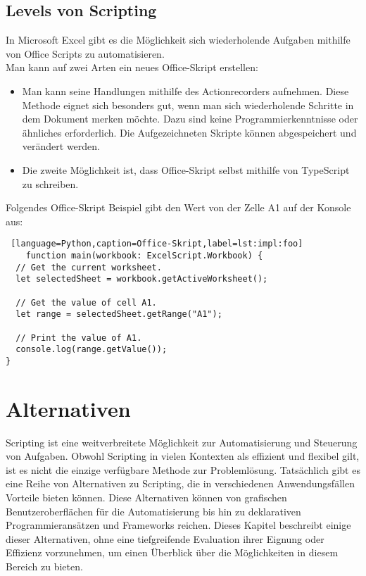 \newpage

\subsection*{Levels von Scripting}

In Microsoft Excel gibt es die Möglichkeit sich wiederholende Aufgaben mithilfe 
von Office Scripts zu automatisieren.
\\
Man kann auf zwei Arten ein neues Office-Skript erstellen:
\begin{itemize}
    \item Man kann seine Handlungen mithilfe des Actionrecorders aufnehmen. 
    Diese Methode eignet sich besonders gut, wenn man sich wiederholende 
    Schritte in dem Dokument merken möchte. Dazu sind keine Programmierkenntnisse 
    oder ähnliches erforderlich. Die Aufgezeichneten Skripte können 
    abgespeichert und verändert werden.
    \item Die zweite Möglichkeit ist, dass Office-Skript selbst mithilfe 
    von TypeScript zu schreiben.
\end{itemize}

Folgendes Office-Skript Beispiel gibt den Wert von der Zelle A1 auf der Konsole aus:

\begin{lstlisting} [language=Python,caption=Office-Skript,label=lst:impl:foo]
    function main(workbook: ExcelScript.Workbook) {
  // Get the current worksheet.
  let selectedSheet = workbook.getActiveWorksheet();

  // Get the value of cell A1.
  let range = selectedSheet.getRange("A1");
  
  // Print the value of A1.
  console.log(range.getValue());
}
\end{lstlisting}

\newpage

\section{Alternativen}

Scripting ist eine weitverbreitete Möglichkeit zur Automatisierung und Steuerung von Aufgaben. 
Obwohl Scripting in vielen Kontexten als effizient und flexibel gilt, ist es nicht die 
einzige verfügbare Methode zur Problemlösung. Tatsächlich gibt es eine Reihe von 
Alternativen zu Scripting, die in verschiedenen Anwendungsfällen Vorteile bieten können. 
Diese Alternativen können von grafischen Benutzeroberflächen für die Automatisierung bis 
hin zu deklarativen Programmieransätzen und Frameworks reichen. Dieses Kapitel beschreibt 
einige dieser Alternativen, ohne eine tiefgreifende Evaluation ihrer Eignung oder Effizienz 
vorzunehmen, um einen Überblick über die Möglichkeiten in diesem Bereich zu bieten.

